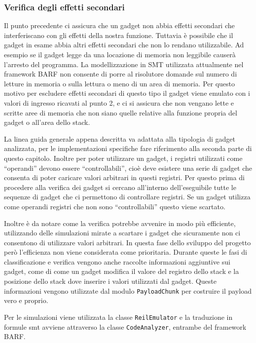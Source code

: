 \subsubsection{Verifica degli effetti secondari}  

Il punto precedente ci assicura che un gadget non abbia effetti
secondari che interferiscano con gli effetti della nostra
funzione. Tuttavia è possibile che il gadget in esame abbia altri
effetti secondari che non lo rendano utilizzabile. Ad esempio se il
gadget legge da una locazione di memoria non leggibile causerà
l'arresto del programma. La modellizzazione in SMT utilizzata
attualmente nel framework BARF non consente di porre al risolutore
domande sul numero di letture in memoria o sulla lettura o meno di
un area di memoria. Per questo motivo per escludere effetti
secondari di questo tipo il gadget viene emulato con i valori di
ingresso ricavati al punto 2, e ci si assicura che non vengano lette
e scritte aree di memoria che non siano quelle relative alla
funzione propria del gadget o all'area dello stack.


La linea guida generale appena descritta va adattata alla tipologia di
gadget analizzata, per le implementazioni specifiche fare riferimento
alla seconda parte di questo capitolo. Inoltre per poter utilizzare un
gadget, i registri utilizzati come ``operandi'' devono essere
``controllabili'', cioè deve esistere una serie di gadget che consenta
di poter caricare valori arbitrari in questi registri. Per questo
prima di procedere alla verifica dei gadget si cercano all'interno
dell'eseguibile tutte le sequenze di gadget che ci permettono di
controllare registri. Se un gadget utilizza come operandi registri che
non sono ``controllabili'' questo viene scartato.

Inoltre è da notare come la verifica potrebbe avvenire in modo più
efficiente, utilizzando delle simulazioni mirate a scartare i gadget
che sicuramente non ci consentono di utilizzare valori arbitrari. In
questa fase dello sviluppo del progetto però l'efficienza non viene
considerata come prioritaria.  Durante queste le fasi di
classificazione e verifica vengono anche raccolte informazioni
aggiuntive sui gadget, come di come un gadget modifica il valore del
registro dello stack e la posizione dello stack dove inserire i valori
utilizzati dal gadget. Queste informazioni vengono utilizzate dal
modulo \lstinline{PayloadChunk} per costruire il payload vero e proprio.


Per le simulazioni viene utilizzata la classe \lstinline{ReilEmulator}
e la traduzione in formule smt avviene attraverso la classe
\lstinline{CodeAnalyzer}, entrambe del framework BARF.


